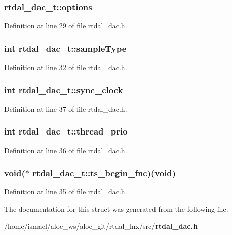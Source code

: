 \subsubsection[{options}]{ rtdal\-\_\-dac\-\_\-t\-::options}\label{structrtdal__dac__t_aa224b5d176deb00b976d486140f750e9}


Definition at line 29 of file rtdal\-\_\-dac.\-h.

\subsubsection[{sample\-Type}]{\setlength{\rightskip}{0pt plus 5cm}int rtdal\-\_\-dac\-\_\-t\-::sample\-Type}\label{structrtdal__dac__t_a3eb33c0022d57c639dbb3e5c7b1efd57}


Definition at line 32 of file rtdal\-\_\-dac.\-h.

\subsubsection[{sync\-\_\-clock}]{\setlength{\rightskip}{0pt plus 5cm}int rtdal\-\_\-dac\-\_\-t\-::sync\-\_\-clock}\label{structrtdal__dac__t_a46edf9cb34c2b8541d1979a1949d4998}


Definition at line 37 of file rtdal\-\_\-dac.\-h.

\subsubsection[{thread\-\_\-prio}]{\setlength{\rightskip}{0pt plus 5cm}int rtdal\-\_\-dac\-\_\-t\-::thread\-\_\-prio}\label{structrtdal__dac__t_a70fef8cd567be40adeab9ca4c30ab235}


Definition at line 36 of file rtdal\-\_\-dac.\-h.

\subsubsection[{ts\-\_\-begin\-\_\-fnc}]{\setlength{\rightskip}{0pt plus 5cm}void($\ast$ rtdal\-\_\-dac\-\_\-t\-::ts\-\_\-begin\-\_\-fnc)(void)}\label{structrtdal__dac__t_a1ac668320b27721486d68e597e95d040}


Definition at line 35 of file rtdal\-\_\-dac.\-h.



The documentation for this struct was generated from the following file\-:\begin{DoxyCompactItemize}
\item 
/home/ismael/aloe\-\_\-ws/aloe\-\_\-git/rtdal\-\_\-lnx/src/{\bf rtdal\-\_\-dac.\-h}\end{DoxyCompactItemize}
